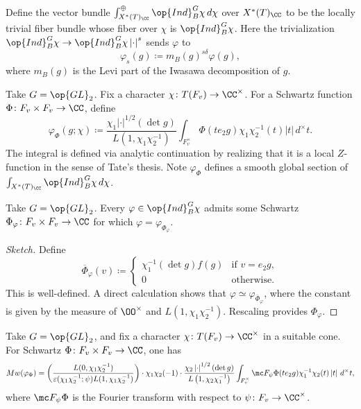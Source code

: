 \documentclass{article}
\begin{document}
\begin{definition}
	Define the vector bundle $\int_{X^*(T)_\CC}^\oplus\op{Ind}_B^G\chi\,d\chi$ over $X^*(T)_\CC$ to be the locally trivial fiber bundle whose fiber over $\chi$ is $\op{Ind}_B^G\chi$. Here the trivialization $\op{Ind}_B^G\chi\to\op{Ind}_B^G\chi\left|\cdot\right|^s$ sends $\varphi$ to
	\[\varphi_s(g)\coloneqq m_B(g)^{s\delta}\varphi(g),\]
	where $m_B(g)$ is the Levi part of the Iwasawa decomposition of $g$.
\end{definition}
\begin{definition}
	Take $G=\op{GL}_2$. Fix a character $\chi\colon T(F_v)\to\CC^\times$. For a Schwartz function $\Phi\colon F_v\times F_v\to\CC$, define
	\[\varphi_\Phi(g;\chi)\coloneqq\frac{\chi_1\left|\cdot\right|^{1/2}(\det g)}{L\left(1,\chi_1\chi_2^{-1}\right)}\int_{F_v^\times}\Phi(te_2g)\chi_1\chi_2^{-1}(t)\left|t\right|\,d^\times t.\]
	The integral is defined via analytic continuation by realizing that it is a local $Z$-function in the sense of Tate's thesis. Note $\varphi_\Phi$ defines a smooth global section of $\int_{X^*(T)_\CC}\op{Ind}_B^G\chi\,d\chi$.
\end{definition}
\begin{lemma}
	Take $G=\op{GL}_2$. Every $\varphi\in\op{Ind}_B^G\chi$ admits some Schwartz $\Phi_\varphi\colon F_v\times F_v\to\CC$ for which $\varphi=\varphi_{\Phi_\varphi}$.
\end{lemma}
\begin{proof}[Sketch]
	Define
	\[\overline\Phi_\varphi(v)\coloneqq\begin{cases}
		\chi_1^{-1}(\det g)f(g) & \text{if }v=e_2g, \\
		0 & \text{otherwise}.
	\end{cases}\]
	This is well-defined. A direct calculation shows that $\varphi\simeq\varphi_{\overline\Phi_\varphi}$, where the constant is given by the measure of $\OO^\times$ and $L\left(1,\chi_1\chi_2^{-1}\right)$. Rescaling provides $\Phi_\varphi$.
\end{proof}
\begin{proposition}
	Take $G=\op{GL}_2$, and fix a character $\chi\colon T(F_v)\to\CC^\times$ in a suitable cone. For Schwartz $\Phi\colon F_v\times F_v\to\CC$, one has
	\[Mw(\varphi_\Phi)=\left(\frac{L(0,\chi_1\chi_2^{-1})}{\varepsilon(\chi_1\chi_2^{-1};\psi)L(1,\chi_1\chi_2^{-1})}\right)\cdot\chi_1\chi_2(-1)\cdot\frac{\chi_2\left|\cdot\right|^{1/2}(\det g)}{L\left(1,\chi_2\chi_1^{-1}\right)}\int_{F_v^\times}\mc F_\psi\Phi(te_2g)\chi_1^{-1}\chi_2(t)\left|t\right|\,d^\times t,\]
	where $\mc F_\psi\Phi$ is the Fourier transform with respect to $\psi\colon F_v\to\CC^\times$.
\end{proposition}
\end{document}
